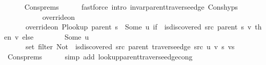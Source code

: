 \begin{isabellebody}
\ \ \ \ \isamarkupfalse%
\ Cons{\isachardot}{\kern0pt}prems\isanewline
\ \ \ \ \isamarkupfalse%
\ {\isacharparenleft}{\kern0pt}fastforce\ intro{\isacharcolon}{\kern0pt}\ invar{\isacharunderscore}{\kern0pt}parent{\isacharunderscore}{\kern0pt}traverse{\isacharunderscore}{\kern0pt}edge\ Cons{\isachardot}{\kern0pt}hyps{\isacharparenright}{\kern0pt}\isanewline
\ \ \isamarkupfalse%
\ \isamarkupfalse%
\isanewline
\ \ \ \ {\isachardoublequoteopen}{\isachardot}{\kern0pt}{\isachardot}{\kern0pt}{\isachardot}{\kern0pt}\ {\isacharequal}{\kern0pt}\isanewline
\ \ \ \ \ override{\isacharunderscore}{\kern0pt}on\isanewline
\ \ \ \ \ \ {\isacharparenleft}{\kern0pt}override{\isacharunderscore}{\kern0pt}on\ {\isacharparenleft}{\kern0pt}P{\isacharunderscore}{\kern0pt}lookup\ {\isacharparenleft}{\kern0pt}parent\ s{\isacharparenright}{\kern0pt}{\isacharparenright}{\kern0pt}\ {\isacharparenleft}{\kern0pt}{\isasymlambda}{\isacharunderscore}{\kern0pt}{\isachardot}{\kern0pt}\ Some\ u{\isacharparenright}{\kern0pt}\ {\isacharparenleft}{\kern0pt}if\ {\isasymnot}\ is{\isacharunderscore}{\kern0pt}discovered\ src\ {\isacharparenleft}{\kern0pt}parent\ s{\isacharparenright}{\kern0pt}\ v\ then\ {\isacharbraceleft}{\kern0pt}v{\isacharbraceright}{\kern0pt}\ else\ {\isacharbraceleft}{\kern0pt}{\isacharbraceright}{\kern0pt}{\isacharparenright}{\kern0pt}{\isacharparenright}{\kern0pt}\isanewline
\ \ \ \ \ \ {\isacharparenleft}{\kern0pt}{\isasymlambda}{\isacharunderscore}{\kern0pt}{\isachardot}{\kern0pt}\ Some\ u{\isacharparenright}{\kern0pt}\isanewline
\ \ \ \ \ \ {\isacharparenleft}{\kern0pt}set\ {\isacharparenleft}{\kern0pt}filter\ {\isacharparenleft}{\kern0pt}Not\ {\isasymcirc}\ is{\isacharunderscore}{\kern0pt}discovered\ src\ {\isacharparenleft}{\kern0pt}parent\ {\isacharparenleft}{\kern0pt}traverse{\isacharunderscore}{\kern0pt}edge\ src\ u\ v\ s{\isacharparenright}{\kern0pt}{\isacharparenright}{\kern0pt}{\isacharparenright}{\kern0pt}\ vs{\isacharparenright}{\kern0pt}{\isacharparenright}{\kern0pt}{\isachardoublequoteclose}\isanewline
\ \ \ \ \isamarkupfalse%
\ Cons{\isachardot}{\kern0pt}prems{\isacharparenleft}{\kern0pt}{}{\isacharparenright}{\kern0pt}\isanewline
\ \ \ \ \isamarkupfalse%
\ {\isacharparenleft}{\kern0pt}simp\ add{\isacharcolon}{\kern0pt}\ lookup{\isacharunderscore}{\kern0pt}parent{\isacharunderscore}{\kern0pt}traverse{\isacharunderscore}{\kern0pt}edge{\isacharunderscore}{\kern0pt}cong{\isacharparenright}{\kern0pt}\isanewline
\ \ \isamarkupfalse%
\ \isamarkupfalse%

\end{isabellebody}
